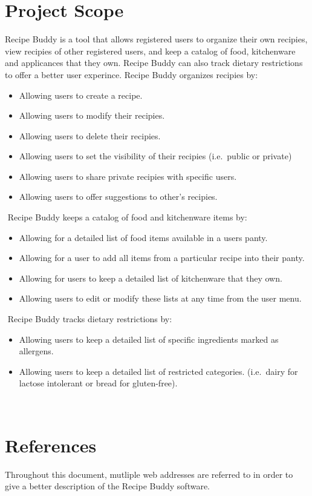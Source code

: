 \documentclass{scrreprt}
\begin{document}
\section{Project Scope}
\gls{Recipe Buddy} is a tool that allows registered users to organize their own recipies, view recipies of other registered users, and keep a catalog of food, kitchenware and applicances that they own. \gls{Recipe Buddy} can also track dietary restrictions to offer a better user experince.
$ $\gls{Recipe Buddy} organizes recipies by:
\begin{itemize}
    \item Allowing users to create a recipe.
    \item Allowing users to modify their recipies.
    \item Allowing users to delete their recipies.
    \item Allowing users to set the visibility of their recipies (i.e.\ public or private)
    \item Allowing users to share private recipies with specific users.
    \item Allowing users to offer suggestions to other's recipies.
\end{itemize}
$ $
$ $\gls{Recipe Buddy} keeps a catalog of food and kitchenware items by:
\begin{itemize}
    \item Allowing for a detailed list of food items available in a users panty.
    \item Allowing for a user to add all items from a particular recipe into their panty.
    \item Allowing for users to keep a detailed list of kitchenware that they own.
    \item Allowing users to edit or modify these lists at any time from the user menu.
\end{itemize}
$ $
$ $\gls{Recipe Buddy} tracks dietary restrictions by:
\begin{itemize}
    \item Allowing users to keep a detailed list of specific ingredients marked as allergens.
    \item Allowing users to keep a detailed list of restricted categories. (i.e.\ dairy for lactose intolerant or bread for gluten-free).
\end{itemize}
$ $

\section{References}
Throughout this document, mutliple web addresses are referred to in order to give a better description of the \gls{Recipe Buddy} software.
\end{document}
